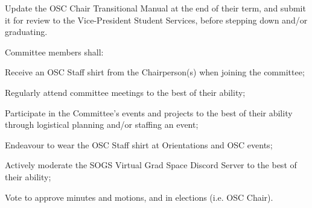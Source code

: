 \begin{longenum}[ label*=\thesubsection.\arabic*., align=left]
\begin{longenum}[label*=\arabic*., align=left]
\begin{longenum}[label*=\arabic*., align=left]
			\item Update the OSC Chair Transitional Manual at the end of their term, and submit it for review to the Vice-President Student Services, before stepping down and/or graduating.						
			\end{longenum}	
		\item Committee members shall:
			\begin{longenum}[label*=\arabic*., align=left]
			\item Receive an OSC Staff shirt from the Chairperson(s) when joining the committee;
			\item Regularly attend committee meetings to the best of their ability;
			\item Participate in the Committee's events and projects to the best of their ability through logistical planning and/or staffing an event;
			\item Endeavour to wear the OSC Staff shirt at Orientations and OSC events;
			\item Actively moderate the SOGS Virtual Grad Space Discord Server to the best of their ability;
			\item Vote to approve minutes and motions, and in elections (i.e. OSC Chair).			 			
			\end{longenum}	
		\end{longenum}
\end{longenum}
	
